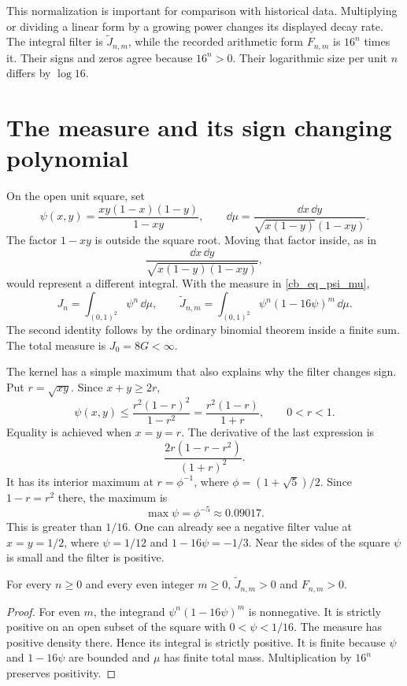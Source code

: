 This normalization is important for comparison with historical data.
Multiplying or dividing a linear form by a growing power changes its
displayed decay rate. The integral filter is $\widetilde J_{n,m}$, while
the recorded arithmetic form $F_{n,m}$ is $16^n$ times it. Their signs and
zeros agree because $16^n>0$. Their logarithmic size per unit $n$ differs by
$\log16$.

\section{The measure and its sign changing polynomial}

On the open unit square, set
\begin{equation}\label{cb_eq_psi_mu}
 \psi(x,y)=\frac{xy(1-x)(1-y)}{1-xy},\qquad
 \dd\mu=\frac{\dd x\,\dd y}{\sqrt{x(1-y)}(1-xy)}.
\end{equation}
The factor $1-xy$ is outside the square root. Moving that factor inside, as in
\[
 \frac{\dd x\,\dd y}{\sqrt{x(1-y)(1-xy)}},
\]
would represent a different integral. With the measure in \eqref{cb_eq_psi_mu},
\[
 J_n=\int_{(0,1)^2}\psi^n\,\dd\mu,
 \qquad
 \widetilde J_{n,m}=\int_{(0,1)^2}\psi^n(1-16\psi)^m\,\dd\mu.
\]
The second identity follows by the ordinary binomial theorem inside a
finite sum. The total measure is $J_0=8G<\infty$.

The kernel has a simple maximum that also explains why the filter changes
sign. Put $r=\sqrt{xy}$. Since $x+y\geq2r$,
\[
 \psi(x,y)\leq\frac{r^2(1-r)^2}{1-r^2}
              =\frac{r^2(1-r)}{1+r},\qquad0<r<1.
\]
Equality is achieved when $x=y=r$. The derivative of the last expression
is
\[
 \frac{2r(1-r-r^2)}{(1+r)^2}.
\]
It has its interior maximum at $r=\phi^{-1}$, where
$\phi=(1+\sqrt5)/2$. Since $1-r=r^2$ there, the maximum is
\begin{equation}\label{cb_eq_psi_max}
 \max\psi=\phi^{-5}\approx0.09017.
\end{equation}
This is greater than $1/16$. One can already see a negative filter value
at $x=y=1/2$, where $\psi=1/12$ and $1-16\psi=-1/3$.
Near the sides of the square $\psi$ is small and the filter is positive.

\begin{theorem}\label{cb_thm_even_positive}
For every $n\geq0$ and every even integer $m\geq0$,
$\widetilde J_{n,m}>0$ and $F_{n,m}>0$.
\end{theorem}

\begin{proof}
For even $m$, the integrand $\psi^n(1-16\psi)^m$ is nonnegative. It is
strictly positive on an open subset of the square with $0<\psi<1/16$.
The measure has positive density there. Hence its integral is strictly
positive. It is finite because $\psi$ and $1-16\psi$ are bounded and
$\mu$ has finite total mass. Multiplication by $16^n$ preserves positivity.
\end{proof}

